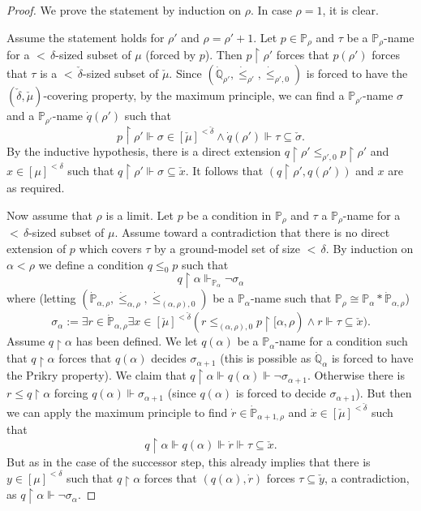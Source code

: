 \documentclass[a4paper]{amsart}
\theoremstyle{definition}
\theoremstyle{remark}
\theoremstyle{plain}
\numberwithin{mydef}{section}
\newcommand{\dP}{\mathbb{P}}
\newcommand{\dQ}{\mathbb{Q}}
\newcommand{\uhr}{\upharpoonright}
\begin{document}
	\begin{proof}
		We prove the statement by induction on $\rho$. In case $\rho=1$, it is clear.
		
		Assume the statement holds for $\rho'$ and $\rho=\rho'+1$. Let $p\in\dP_{\rho}$ and $\tau$ be a $\dP_{\rho}$-name for a ${<}\,\delta$-sized subset of $\mu$ (forced by $p$). Then $p\uhr\rho'$ forces that $p(\rho')$ forces that $\tau$ is a ${<}\,\check{\delta}$-sized subset of $\check{\mu}$. Since $(\dot{\dQ}_{\rho'},\dot{\leq}_{\rho'},\dot{\leq}_{\rho',0})$ is forced to have the $(\check{\delta},\check{\mu})$-covering property, by the maximum principle, we can find a $\dP_{\rho'}$-name $\sigma$ and a $\dP_{\rho'}$-name $\dot{q}(\rho')$ such that
		$$p\uhr\rho'\Vdash\sigma\in[\check{\mu}]^{<\check{\delta}}\wedge \dot{q}(\rho')\Vdash\tau\subseteq\check{\sigma}.$$
		By the inductive hypothesis, there is a direct extension $q\uhr\rho'\leq_{\rho',0}p\uhr\rho'$ and $x\in[\mu]^{<\delta}$ such that $q\uhr\rho'\Vdash\sigma\subseteq\check{x}$. It follows that $(q\uhr\rho',q(\rho'))$ and $x$ are as required.
		
		Now assume that $\rho$ is a limit. Let $p$ be a condition in $\dP_{\rho}$ and $\tau$ a $\dP_{\rho}$-name for a ${<}\,\delta$-sized subset of $\mu$. Assume toward a contradiction that there is no direct extension of $p$ which covers $\tau$ by a ground-model set of size ${<}\,\delta$. By induction on $\alpha<\rho$ we define a condition $q\leq_0p$ such that
		$$q\uhr\alpha\Vdash_{\dP_{\alpha}}\neg\sigma_{\alpha}$$
		where (letting $(\dot{\dP}_{\alpha,\rho},\dot{\leq}_{\alpha,\rho},\dot{\leq}_{(\alpha,\rho),0})$ be a $\dP_{\alpha}$-name such that $\dP_{\rho}\cong\dP_{\alpha}*\dot{\dP}_{\alpha,\rho}$)
		$$\sigma_{\alpha}:=\exists r\in\dot{\dP}_{\alpha,\rho}\exists x\in[\check{\mu}]^{<\check{\delta}}(r\leq_{(\alpha,\rho),0}p\uhr[\alpha,\rho)\wedge r\Vdash\tau\subseteq\check{x}).$$
		Assume $q\uhr\alpha$ has been defined. We let $q(\alpha)$ be a $\dP_{\alpha}$-name for a condition such that $q\uhr\alpha$ forces that $q(\alpha)$ decides $\sigma_{\alpha+1}$ (this is possible as $\dot{\dQ}_{\alpha}$ is forced to have the Prikry property). We claim that $q\uhr\alpha\Vdash q(\alpha)\Vdash\neg\sigma_{\alpha+1}$. Otherwise there is $r\leq q\uhr\alpha$ forcing $q(\alpha)\Vdash\sigma_{\alpha+1}$ (since $q(\alpha)$ is forced to decide $\sigma_{\alpha+1}$). But then we can apply the maximum principle to find $\dot{r}\in\dot{\dP}_{\alpha+1,\rho}$ and $\dot{x}\in[\check{\mu}]^{<\check{\delta}}$ such that
		$$q\uhr\alpha\Vdash q(\alpha)\Vdash \dot{r}\Vdash\tau\subseteq\check{x}.$$
		But as in the case of the successor step, this already implies that there is $y\in[\mu]^{<\delta}$ such that $q\uhr\alpha$ forces that $(q(\alpha),\dot{r})$ forces $\tau\subseteq \check{y}$, a contradiction, as $q\uhr\alpha\Vdash\neg\sigma_{\alpha}$.
		

\end{proof}
\end{document}
